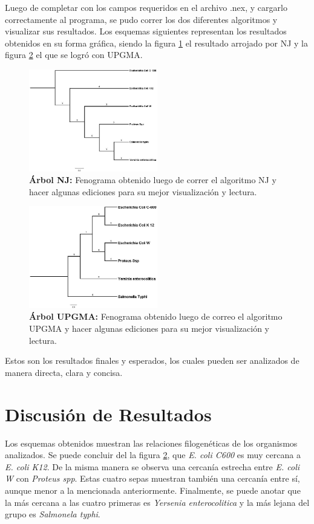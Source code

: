 \documentclass[%
 reprint,
 amsmath,amssymb,
 aps,
showkeys,
letter,
12pts
]{revtex4-1}
\begin{document}
		Luego de completar con los campos requeridos en el archivo .nex, y cargarlo correctamente al programa, se pudo correr los dos diferentes algoritmos y visualizar sus resultados. Los esquemas siguientes representan los resultados obtenidos en su forma gráfica, siendo la figura \ref{Grafica:Nj} el resultado arrojado por NJ y la figura \ref{Grafica:UPGMA} el que se logró con UPGMA.
		
		\begin{figure}[h!]
		\includegraphics[width=0.5\textwidth]{arbolNJ.jpg}
		\caption{\textbf{Árbol NJ:} Fenograma obtenido luego de correr el algoritmo NJ y hacer algunas ediciones para su mejor visualización y lectura.}
		\label{Grafica:Nj}	
		\end{figure}
	
		\begin{figure}[h!]
		\includegraphics[width=0.5\textwidth]{arbolUPGMA.jpg}
		\caption{\textbf{Árbol UPGMA:} Fenograma obtenido luego de correo el algoritmo UPGMA y hacer algunas ediciones para su mejor visualización y lectura.}
		\label{Grafica:UPGMA}
		\end{figure}	
		
		Estos son los resultados finales y esperados, los cuales pueden ser analizados de manera directa, clara y concisa.

\section{\label{sec:Dis}Discusión de Resultados}
	Los esquemas obtenidos muestran las relaciones filogenéticas de los organismos analizados. Se puede concluir del la figura \ref{Grafica:UPGMA}, que \textit{E. coli C600} es muy cercana a \textit{E. coli K12}. De la misma manera se observa una cercanía estrecha entre \textit{E. coli W} con \textit{Proteus spp}. Estas cuatro sepas muestran también una cercanía entre sí, aunque menor a la mencionada anteriormente. Finalmente, se puede anotar que la más cercana a las cuatro primeras es \textit{Yersenia enterocolitica} y la más lejana del grupo es \textit{Salmonela typhi}.
	
\end{document}
